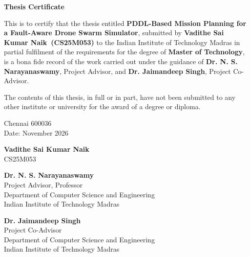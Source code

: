 \documentclass[11pt,a4paper,oneside]{report}
\newcommand{\thesistitle}{PDDL-Based Mission Planning for a Fault-Aware Drone Swarm Simulator}
\newcommand{\authorname}{Vadithe Sai Kumar Naik}
\newcommand{\rollno}{CS25M053}
\newcommand{\submitdate}{November 2026}
\newcommand{\advisor}{Dr. N. S. Narayanaswamy}
\newcommand{\coadvisor}{Dr. Jaimandeep Singh}
\begin{document}
\thispagestyle{empty}
\begin{center}
  {\LARGE\bfseries Thesis Certificate\par}
\end{center}
\vspace{0.8cm}
\noindent This is to certify that the thesis entitled \textbf{\thesistitle}, submitted by
\textbf{\authorname\ (\rollno)} to the Indian Institute of Technology Madras in partial
fulfilment of the requirements for the degree of \textbf{Master of Technology}, is a bona fide
record of the work carried out under the guidance of \textbf{\advisor}, Project Advisor, and
\textbf{\coadvisor}, Project Co-Advisor.

\noindent The contents of this thesis, in full or in part, have not been submitted to any other
institute or university for the award of a degree or diploma.

\vspace{2.2cm}
\noindent
\begin{minipage}[t]{0.5\textwidth}
  Chennai 600036\\
  Date: \submitdate
\end{minipage}%
\begin{minipage}[t]{0.5\textwidth}
  \raggedleft{}
  \textbf{\authorname}\\
  \rollno
\end{minipage}

\vspace{2.6cm}
\begin{flushright}
  \textbf{\advisor}\\
  Project Advisor, Professor\\
  Department of Computer Science and Engineering\\
  Indian Institute of Technology Madras
\end{flushright}

\vspace{1.8cm}
\begin{flushright}
  \textbf{\coadvisor}\\
  Project Co-Advisor\\
  Department of Computer Science and Engineering\\
  Indian Institute of Technology Madras
\end{flushright}
\end{document}
